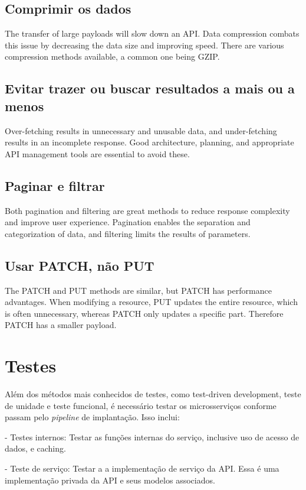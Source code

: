 \subsection{Comprimir os dados}
The transfer of large payloads will slow down an API. Data compression combats this issue by decreasing the data size and improving speed. There are various compression methods available, a common one being GZIP. \cite{rapidAPI-twitter}

\subsection{Evitar trazer ou buscar resultados a mais ou a menos}
Over-fetching results in unnecessary and unusable data, and under-fetching results in an incomplete response. Good architecture, planning, and appropriate API management tools are essential to avoid these. \cite{rapidAPI-twitter}

\subsection{Paginar e filtrar}
Both pagination and filtering are great methods to reduce response complexity and improve user experience. Pagination enables the separation and categorization of data, and filtering limits the results of parameters. \cite{rapidAPI-twitter}

\subsection{Usar PATCH, não PUT}
The PATCH and PUT methods are similar, but PATCH has performance advantages. When modifying a resource, PUT updates the entire resource, which is often unnecessary, whereas PATCH only updates a specific part. Therefore PATCH has a smaller payload. \cite{rapidAPI-twitter}

\section{Testes}

Além dos métodos mais conhecidos de testes, como test-driven development, teste de unidade e teste funcional, é necessário testar os microsserviços conforme passam pelo \emph{pipeline} de implantação. Isso inclui:

- Testes internos: Testar as funções internas do serviço, inclusive uso de acesso de dados, e caching.

- Teste de serviço: Testar a a implementação de serviço da API. Essa é uma implementação privada da API e seus modelos associados.

